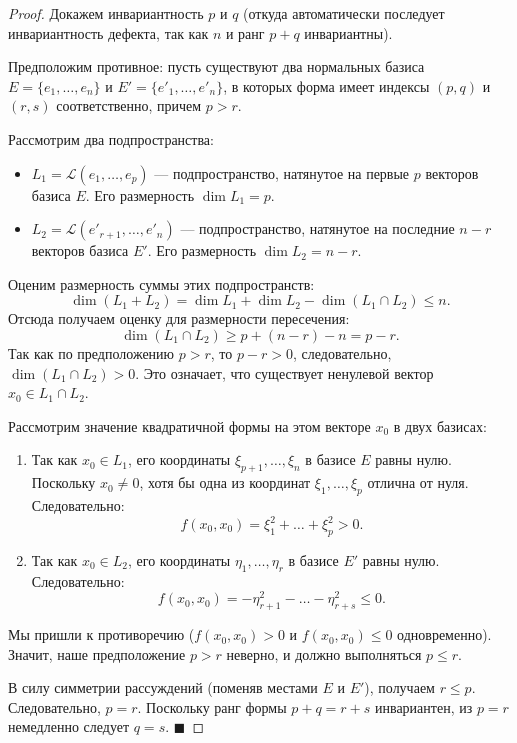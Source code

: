 \begin{proof}
Докажем инвариантность $p$ и $q$ (откуда автоматически последует инвариантность дефекта, так как $n$ и ранг $p+q$ инвариантны).

Предположим противное: пусть существуют два нормальных базиса $E = \{e_1, \dots, e_n\}$ и $E' = \{e'_1, \dots, e'_n\}$, в которых форма имеет индексы $(p, q)$ и $(r, s)$ соответственно, причем $p > r$.

Рассмотрим два подпространства:
\begin{itemize}
    \item $L_1 = \mathcal{L}(e_1, \dots, e_p)$ --- подпространство, натянутое на первые $p$ векторов базиса $E$. Его размерность $\dim L_1 = p$.
    \item $L_2 = \mathcal{L}(e'_{r+1}, \dots, e'_n)$ --- подпространство, натянутое на последние $n - r$ векторов базиса $E'$. Его размерность $\dim L_2 = n - r$.
\end{itemize}

Оценим размерность суммы этих подпространств:
\[
\dim(L_1 + L_2) = \dim L_1 + \dim L_2 - \dim(L_1 \cap L_2) \le n.
\]
Отсюда получаем оценку для размерности пересечения:
\[
\dim(L_1 \cap L_2) \ge p + (n - r) - n = p - r.
\]
Так как по предположению $p > r$, то $p - r > 0$, следовательно, $\dim(L_1 \cap L_2) > 0$. Это означает, что существует ненулевой вектор $x_0 \in L_1 \cap L_2$.

Рассмотрим значение квадратичной формы на этом векторе $x_0$ в двух базисах:
\begin{enumerate}
    \item Так как $x_0 \in L_1$, его координаты $\xi_{p+1}, \dots, \xi_n$ в базисе $E$ равны нулю. Поскольку $x_0 \neq 0$, хотя бы одна из координат $\xi_1, \dots, \xi_p$ отлична от нуля. Следовательно:
    \[
    f(x_0, x_0) = \xi_1^2 + \dots + \xi_p^2 > 0.
    \]
    \item Так как $x_0 \in L_2$, его координаты $\eta_1, \dots, \eta_r$ в базисе $E'$ равны нулю. Следовательно:
    \[
    f(x_0, x_0) = -\eta_{r+1}^2 - \dots - \eta_{r+s}^2 \le 0.
    \]
\end{enumerate}
Мы пришли к противоречию ($f(x_0, x_0) > 0$ и $f(x_0, x_0) \le 0$ одновременно). Значит, наше предположение $p > r$ неверно, и должно выполняться $p \le r$. 

В силу симметрии рассуждений (поменяв местами $E$ и $E'$), получаем $r \le p$. Следовательно, $p = r$.
Поскольку ранг формы $p + q = r + s$ инвариантен, из $p = r$ немедленно следует $q = s$.
\hfill$\blacksquare$
\end{proof}
